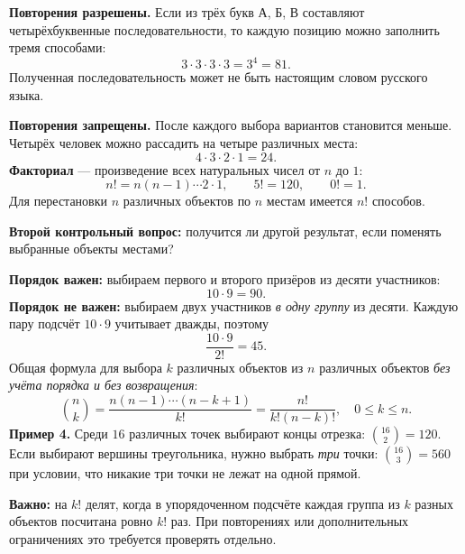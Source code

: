 \documentclass[a4paper,12pt]{article}
\newcommand{\Section}[1]{\vspace{5pt}{\large\bfseries\color{darkaccent}#1}\par\vspace{2pt}}
\newcommand{\Key}[1]{\textbf{\color{darkaccent}#1}}
\begin{document}
\textbf{Повторения разрешены.} Если из трёх букв А, Б, В составляют четырёхбуквенные последовательности, то каждую позицию можно заполнить тремя способами:
\[
3\cdot3\cdot3\cdot3=3^4=\boxed{81}.
\]
Полученная последовательность может не быть настоящим словом русского языка.

\textbf{Повторения запрещены.} После каждого выбора вариантов становится меньше. Четырёх человек можно рассадить на четыре различных места:
\[
4\cdot3\cdot2\cdot1=\boxed{24}.
\]
\Key{Факториал} --- произведение всех натуральных чисел от $n$ до $1$:
\[
n!=n(n-1)\cdots2\cdot1,\qquad 5!=120,\qquad 0!=1.
\]
Для перестановки $n$ различных объектов по $n$ местам имеется $n!$ способов.

\Section{4. Важен ли порядок?}
\Key{Второй контрольный вопрос:} получится ли другой результат, если поменять выбранные объекты местами?

\textbf{Порядок важен:} выбираем первого и второго призёров из десяти участников:
\[
10\cdot9=\boxed{90}.
\]
\textbf{Порядок не важен:} выбираем двух участников \emph{в одну группу} из десяти. Каждую пару подсчёт $10\cdot9$ учитывает дважды, поэтому
\[
\frac{10\cdot9}{2!}=\boxed{45}.
\]
Общая формула для выбора $k$ различных объектов из $n$ различных объектов \emph{без учёта порядка и без возвращения}:
\[
\binom{n}{k}=\frac{n(n-1)\cdots(n-k+1)}{k!}=\frac{n!}{k!(n-k)!},\quad 0\leq k\leq n.
\]
\textbf{Пример 4.} Среди $16$ различных точек выбирают концы отрезка: $\binom{16}{2}=120$. Если выбирают вершины треугольника, нужно выбрать \emph{три} точки: $\binom{16}{3}=560$ при условии, что никакие три точки не лежат на одной прямой.

\Key{Важно:} на $k!$ делят, когда в упорядоченном подсчёте каждая группа из $k$ разных объектов посчитана ровно $k!$ раз. При повторениях или дополнительных ограничениях это требуется проверять отдельно.
\end{document}
